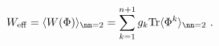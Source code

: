 \begin{equation} 
W_{\rm eff}=\langle W(\Phi)\rangle_{\nn=2}
=\sum_{k=1}^{n+1}g_k{\rm Tr}\langle\Phi^k\rangle_{\nn=2} \ .
\end{equation}

